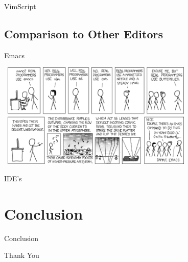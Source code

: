 \documentclass{beamer}
\begin{document}
            \begin{frame}{VimScript}
            \end{frame}

        \subsection{Comparison to Other Editors}

            \begin{frame}{Emacs}
                \begin{center}
                \includegraphics[width = 9.5cm, height = 5cm]{real_programmers.png}
                \end{center}
            \end{frame}

            \begin{frame}{IDE's}
            \end{frame}

    \section*{Conclusion}

            \begin{frame}{Conclusion}
            \end{frame}

            \begin{frame}{Thank You}
            \end{frame}
\end{document}
